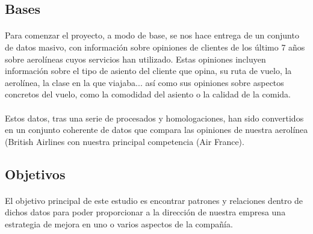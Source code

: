 \documentclass{report}
\begin{document}
            \subsection{Bases}
                \paragraph*{}{
                Para comenzar el proyecto, a modo de base, se nos hace entrega de un conjunto de datos masivo, con información sobre opiniones de clientes de los último 7 años sobre aerolíneas cuyos servicios han utilizado. Estas opiniones incluyen información sobre el tipo de asiento del cliente que opina, su ruta de vuelo, la aerolínea, la clase en la que viajaba... así como sus opiniones sobre aspectos concretos del vuelo, como la comodidad del asiento o la calidad de la comida. 
                }
                \paragraph*{}{Estos datos, tras una serie de procesados y homologaciones, han sido convertidos en un conjunto coherente de datos que compara las opiniones de nuestra aerolínea (British Airlines} con nuestra principal competencia (Air France).
            \subsection{Objetivos}
                \paragraph*{}{El objetivo principal de este estudio es encontrar patrones y relaciones dentro de dichos datos para poder proporcionar a la dirección de nuestra empresa una estrategia de mejora en uno o varios aspectos de la compañía.}
\end{document}
